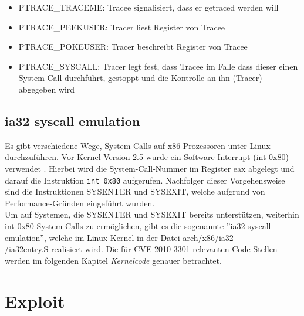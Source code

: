 \documentclass[11pt,a4paper]{article}
\begin{document}
\begin{itemize}
\item PTRACE\_TRACEME: Tracee signalisiert, dass er getraced werden will
\item PTRACE\_PEEKUSER: Tracer liest Register von Tracee
\item PTRACE\_POKEUSER: Tracer beschreibt Register von Tracee
\item PTRACE\_SYSCALL: Tracer legt fest, dass Tracee im Falle dass dieser einen System-Call durchführt, gestoppt und die Kontrolle an ihn (Tracer) abgegeben wird
\end{itemize}{\cite{DIE0}
\subsection{ia32 syscall emulation}
Es gibt verschiedene Wege, System-Calls auf x86-Prozessoren unter Linux durchzuführen. Vor Kernel-Version 2.5 wurde ein Software Interrupt (int 0x80) verwendet \cite{GAR0}. Hierbei wird die System-Call-Nummer im Register eax abgelegt und darauf die Instruktion \texttt{int 0x80} aufgerufen. Nachfolger dieser Vorgehensweise sind die Instruktionen SYSENTER und SYSEXIT, welche aufgrund von Performance-Gründen eingeführt wurden. \cite{JES0}\cite{WIK0}\\
Um auf Systemen, die SYSENTER und SYSEXIT bereits unterstützen, weiterhin int 0x80 System-Calls zu ermöglichen, gibt es die sogenannte ''ia32 syscall emulation'', welche im Linux-Kernel in der Datei arch/x86/ia32\\
/ia32entry.S realisiert wird. Die für CVE-2010-3301 relevanten Code-Stellen werden im folgenden Kapitel \emph{Kernelcode} genauer betrachtet.
\section{Exploit}
}
\end{document}
